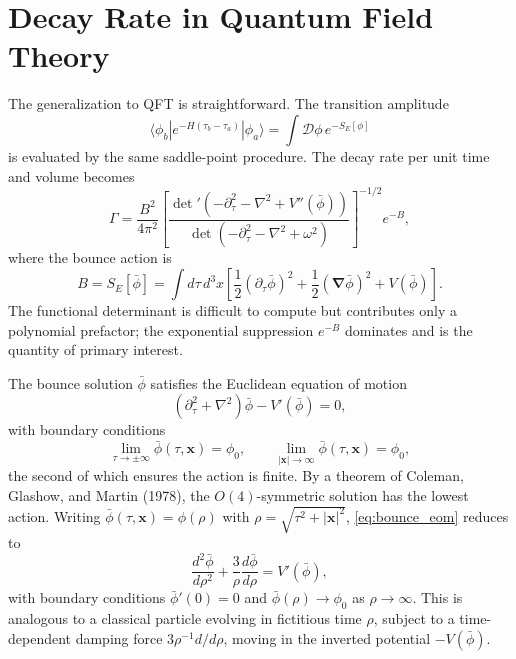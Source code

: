 \section{Decay Rate in Quantum Field Theory}

The generalization to QFT is straightforward. The transition amplitude
\begin{equation}
    \langle\phi_b|e^{-H(\tau_b-\tau_a)}|\phi_a\rangle
    = \int\mathcal{D}\phi\,e^{-S_E[\phi]}
\end{equation}
is evaluated by the same saddle-point procedure. The decay rate per
unit time and volume becomes
\begin{equation}
    \Gamma = \frac{B^2}{4\pi^2}
    \left[\frac{\det'(-\partial_\tau^2-\nabla^2+V''(\bar\phi))}
    {\det(-\partial_\tau^2-\nabla^2+\omega^2)}\right]^{-1/2}e^{-B},
\end{equation}
where the bounce action is
\begin{equation}
    B = S_E[\bar\phi] = \int d\tau\,d^3x\left[
    \frac{1}{2}(\partial_\tau\bar\phi)^2
    + \frac{1}{2}(\boldsymbol\nabla\bar\phi)^2
    + V(\bar\phi)\right].
\end{equation}
The functional determinant is difficult to compute but contributes
only a polynomial prefactor; the exponential suppression $e^{-B}$
dominates and is the quantity of primary interest.

The bounce solution $\bar\phi$ satisfies the Euclidean equation of
motion
\begin{equation}
    (\partial_\tau^2 + \nabla^2)\bar\phi - V'(\bar\phi) = 0,
    \label{eq:bounce_eom}
\end{equation}
with boundary conditions
\begin{equation}
    \lim_{\tau\to\pm\infty}\bar\phi(\tau,\mathbf{x}) = \phi_0,
    \qquad
    \lim_{|\mathbf{x}|\to\infty}\bar\phi(\tau,\mathbf{x}) = \phi_0,
\end{equation}
the second of which ensures the action is finite. By a theorem of
Coleman, Glashow, and Martin (1978), the $O(4)$-symmetric solution
has the lowest action. Writing $\bar\phi(\tau,\mathbf{x}) = \phi(\rho)$
with $\rho = \sqrt{\tau^2+|\mathbf{x}|^2}$, \eqref{eq:bounce_eom}
reduces to
\begin{equation}
    \frac{d^2\bar\phi}{d\rho^2} + \frac{3}{\rho}\frac{d\bar\phi}{d\rho}
    = V'(\bar\phi),
    \label{eq:spherical_eom}
\end{equation}
with boundary conditions $\bar\phi'(0) = 0$ and
$\bar\phi(\rho)\to\phi_0$ as $\rho\to\infty$. This is analogous to a
classical particle evolving in fictitious time $\rho$, subject to a
time-dependent damping force $3\rho^{-1}d/d\rho$, moving in the
inverted potential $-V(\bar\phi)$.

